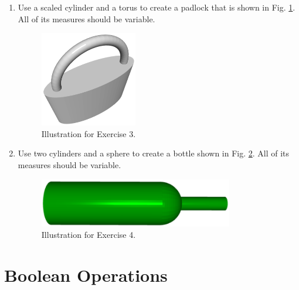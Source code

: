 \documentclass{article}
\begin{document}
\begin{enumerate}
\item Use a scaled cylinder and a torus to create a padlock that is shown in Fig. \ref{fig:b3}. 
All of its measures should be variable.

\newpage

\begin{figure}[!ht]
\begin{center}
\includegraphics[width=0.4\textwidth]{img/padlock.png}
\end{center}
\vspace{-2mm}
\caption{Illustration for Exercise 3.}
\label{fig:b3}
\end{figure}

\item Use two cylinders and a sphere to create a bottle shown in Fig. \ref{fig:b4}. 
All of its measures should be variable.

\begin{figure}[!ht]
\begin{center}
\includegraphics[width=0.8\textwidth]{img/bottle.png}
\end{center}
\vspace{-2mm}
\caption{Illustration for Exercise 4.}
\label{fig:b4}
\end{figure}

\end{enumerate}

\section{Boolean Operations}
\end{document}

